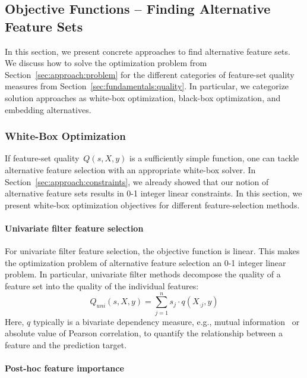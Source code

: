 \documentclass{article}
\theoremstyle{definition}
\begin{document}
\subsection{Objective Functions -- Finding Alternative Feature Sets}
\label{sec:approach:objectives}

In this section, we present concrete approaches to find alternative feature sets.
We discuss how to solve the optimization problem from Section~\ref{sec:approach:problem} for the different categories of feature-set quality measures from Section~\ref{sec:fundamentals:quality}.
In particular, we categorize solution approaches as white-box optimization, black-box optimization, and embedding alternatives.

\subsubsection{White-Box Optimization}
\label{sec:approach:objectives:white-box}

If feature-set quality~$Q(s,X,y)$ is a sufficiently simple function, one can tackle alternative feature selection with an appropriate white-box solver.
In Section~\ref{sec:approach:constraints}, we already showed that our notion of alternative feature sets results in 0-1 integer linear constraints.
In this section, we present white-box optimization objectives for different feature-selection methods.

\paragraph{Univariate filter feature selection}

For univariate filter feature selection, the objective function is linear.
This makes the optimization problem of alternative feature selection an 0-1 integer linear problem.
In particular, univariate filter methods decompose the quality of a feature set into the quality of the individual features:
%
\begin{equation}
	Q_{uni}(s,X,y) = \sum_{j=1}^{n} s_j  \cdot q(X_{\cdot{}j},y)
	\label{eq:univariate-filter}
\end{equation}
%
Here, $q$ typically is a bivariate dependency measure, e.g., mutual information~\cite{kraskov2004estimating} or absolute value of Pearson correlation, to quantify the relationship between a feature and the prediction target.

\paragraph{Post-hoc feature importance}
\end{document}
